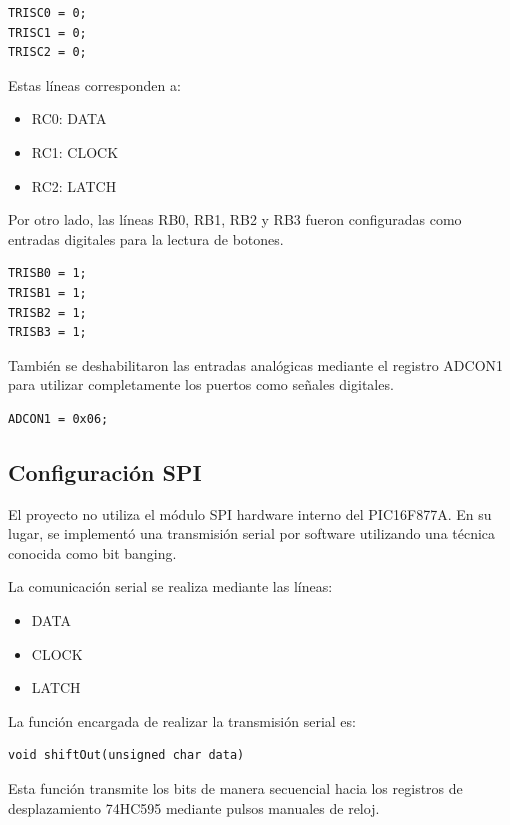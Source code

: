 \begin{verbatim}
TRISC0 = 0;
TRISC1 = 0;
TRISC2 = 0;
\end{verbatim}

Estas líneas corresponden a:

\begin{itemize}
    \item RC0: DATA
    \item RC1: CLOCK
    \item RC2: LATCH
\end{itemize}

Por otro lado, las líneas RB0, RB1, RB2 y RB3 fueron configuradas como entradas digitales para la lectura de botones.

\begin{verbatim}
TRISB0 = 1;
TRISB1 = 1;
TRISB2 = 1;
TRISB3 = 1;
\end{verbatim}

También se deshabilitaron las entradas analógicas mediante el registro ADCON1 para utilizar completamente los puertos como señales digitales.

\begin{verbatim}
ADCON1 = 0x06;
\end{verbatim}

\subsection{Configuración SPI}

El proyecto no utiliza el módulo SPI hardware interno del PIC16F877A. En su lugar, se implementó una transmisión serial por software utilizando una técnica conocida como bit banging.

La comunicación serial se realiza mediante las líneas:

\begin{itemize}
    \item DATA
    \item CLOCK
    \item LATCH
\end{itemize}

La función encargada de realizar la transmisión serial es:

\begin{verbatim}
void shiftOut(unsigned char data)
\end{verbatim}

Esta función transmite los bits de manera secuencial hacia los registros de desplazamiento 74HC595 mediante pulsos manuales de reloj.

